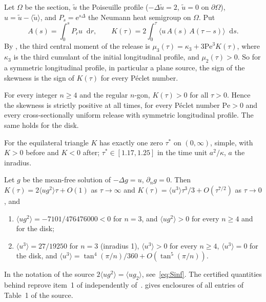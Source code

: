 \documentclass[11pt,a4paper]{report}
\DeclareRobustCommand*{\avg}[1]{\langle #1\rangle}
\DeclareRobustCommand*{\ut}{\tilde u}
\DeclareRobustCommand*{\dd}{\mathop{}\!\mathrm{d}}
\DeclareRobustCommand*{\sg}{\mathrm{e}^{s\Delta}}
\begin{document}
Let \(\Omega\) be the section, \(\ut\) the Poiseuille profile (\(-\Delta\ut=2\), \(\ut=0\) on \(\partial\Omega\)),
\(u=\ut-\avg{\ut}\), and \(P_s=\sg\) the Neumann heat semigroup on \(\Omega\). Put
\begin{equation}\label{eq:K}
A(s)=\int_0^sP_ru\dd r,\qquad K(\tau)=2\int_0^\tau\avg{u\,A(s)\,A(\tau-s)}\dd s .
\end{equation}
By , the third central moment of the release is \(\mu_3(\tau)=\kappa_3+3\mathrm{Pe}^3K(\tau)\),
where \(\kappa_3\) is the third cumulant of the initial longitudinal profile, and \(\mu_2(\tau)>0\). So for a symmetric
longitudinal profile, in particular a plane source, the sign of the skewness is the sign of \(K(\tau)\) for every
Péclet number.

\begin{theorem}\label{thm:main}
For every integer \(n\ge4\) and the regular \(n\)-gon, \(K(\tau)>0\) for all \(\tau>0\). Hence the skewness is strictly
positive at all times, for every Péclet number \(\mathrm{Pe}>0\) and every cross-sectionally uniform release with symmetric longitudinal
profile. The same holds for the disk.
\end{theorem}

\begin{theorem}\label{thm:triangle}
For the equilateral triangle \(K\) has exactly one zero \(\tau^*\) on \((0,\infty)\), simple, with \(K>0\) before and
\(K<0\) after; \(\tau^*\in[1.17,1.25]\) in the time unit \(a^2/\kappa\), \(a\) the inradius.
\end{theorem}

\begin{theorem}[note=the two ends]\label{thm:ends}
Let \(g\) be the mean-free solution of \(-\Delta g=u\), \(\partial_ng=0\). Then
\(K(\tau)=2\avg{ug^2}\tau+O(1)\) as \(\tau\to\infty\) and \(K(\tau)=\avg{u^3}\tau^3/3+O(\tau^{7/2})\) as \(\tau\to0\), and
\begin{enumerate}
\item \(\avg{ug^2}=-7101/476476000<0\) for \(n=3\), and \(\avg{ug^2}>0\) for every \(n\ge4\) and for the disk;
\item \(\avg{u^3}=27/19250\) for \(n=3\) (inradius 1), \(\avg{u^3}>0\) for every \(n\ge4\), \(\avg{u^3}=0\) for the disk, and
\(\avg{u^3}=\tan^4(\pi/n)/360+O(\tan^5(\pi/n))\).
\end{enumerate}
\end{theorem}

In the notation of the source \(2\avg{ug^2}=\avg{ug_2}\), see~\eqref{eq:Sinf}. The certified quantities behind  reprove item~1 of 
independently of~\autocite{Result14}.  gives enclosures of all entries of Table~1 of the source.
\end{document}
